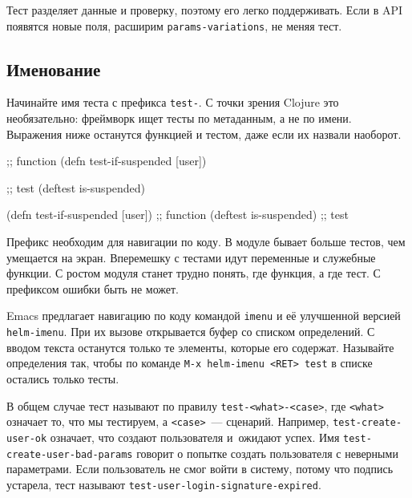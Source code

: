 \fi

Тест разделяет данные и проверку, поэтому его легко поддерживать. Если в API
появятся новые поля, расширим \verb|params-variations|, не меняя тест.

\subsection{Именование}

Начинайте имя теста с префикса \verb|test-|. С точки зрения Clojure это
необязательно: фреймворк ищет тесты по метаданным, а не по имени. Выражения ниже
останутся функцией и тестом, даже если их назвали наоборот.

\ifx\devicetype\mobile

\begin{english}
  \begin{clojure}
;; function
(defn test-if-suspended [user])

;; test
(deftest is-suspended)
  \end{clojure}
\end{english}

\else

\begin{english}
  \begin{clojure}
(defn test-if-suspended [user]) ;; function
(deftest is-suspended)          ;; test
  \end{clojure}
\end{english}

\fi

Префикс необходим для навигации по коду. В модуле бывает больше тестов, чем
умещается на экран. Вперемешку с тестами идут переменные и служебные функции. С
ростом модуля станет трудно понять, где функция, а где тест. С префиксом ошибки
быть не может.


Emacs предлагает навигацию по коду командой \verb|imenu| и её улучшенной
версией \verb|helm-imenu|. При их вызове открывается буфер со списком
определений. С вводом текста останутся только те элементы, которые его
содержат. Называйте определения так, чтобы по команде \verb|M-x helm-imenu <RET> test|
в списке остались только тесты.

В общем случае тест называют по правилу \verb|test-<what>-<case>|, где
\verb|<what>| означает то, что мы тестируем, а \verb|<case>|~--- сценарий. Например,
\verb|test-create-user-ok| означает, что создают пользователя и~ожидают
успех. Имя \verb|test-create-user-bad-params| говорит о попытке создать
пользователя с неверными параметрами. Если пользователь не смог войти в систему,
потому что подпись устарела, тест называют
\verb|test-user-login-signature-expired|.

